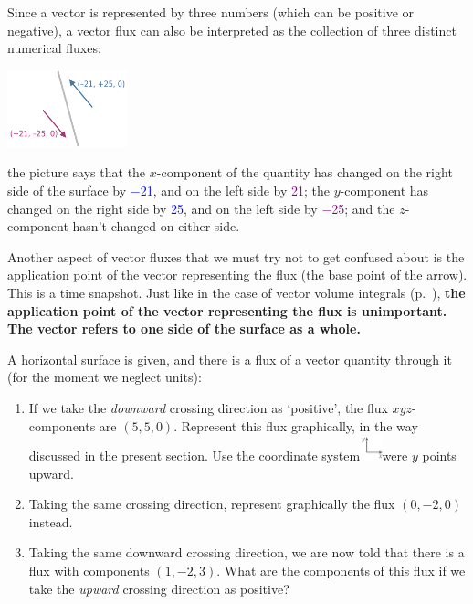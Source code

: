 \documentclass[a4paper,12pt,%
onecolumn,oneside,titlepage,%
british%
]{memoir}
\renewcommand*{\|}[1][]{\nonscript\:#1\vert\nonscript\:\mathopen{}}
\begin{document}
\smallskip

Since a vector is represented by three numbers (which can be positive or negative), a vector flux can also be interpreted as the collection of three distinct numerical fluxes:
\begin{center}
  \includegraphics[height=6em]{flux_vec_minusplus_num.pdf}
\end{center}
the picture says that the $x$-component of the quantity has changed on the right side of the surface by \textcolor{blue}{\num{-21}}, and on the left side by \textcolor{purple}{\num{+21}}; the $y$-component  has changed on the right side by \textcolor{blue}{\num{+25}}, and on the left side by \textcolor{purple}{\num{-25}}; and the $z$-component hasn't changed on either side.

\medskip

Another aspect of vector fluxes that we must try not to get confused about is the application point of the vector representing the flux (the base point of the arrow). This is a time snapshot. Just like in the case of vector volume integrals (p.~\pageref{item:applicationpoint}), \textbf{the application point of the vector representing the flux is unimportant. The vector refers to one side of the surface as a whole.}

\medskip

\begin{exercise}
  A horizontal surface is given, and there is a flux of a vector quantity through it (for the moment we neglect units):
  \begin{enumerate}[label=\arabic*.]
  \item If we take the \emph{downward} crossing direction as \enquote*{positive}, the flux $xyz$-components are $(5,5,0)$. Represent this flux graphically, in the way discussed in the present section. Use the coordinate system\enspace\includegraphics[align=c,height=2em]{coords_xy.pdf}\enspace were $y$ points upward.
  \item Taking the same crossing direction, represent graphically the flux $(0,-2,0)$ instead.
  \item Taking the same downward crossing direction, we are now told that there is a flux with components $(1,-2,3)$. What are the components of this flux if we take the \emph{upward} crossing direction as positive?
  \end{enumerate}
\end{exercise}
\end{document}
